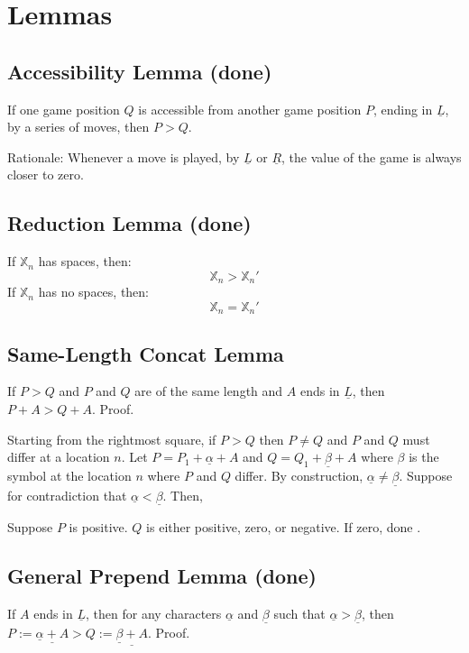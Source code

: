 \documentclass[11pt]{article}
\begin{document}
\section*{Lemmas}
\label{sec:orgdcb17ac}
\subsection*{Accessibility Lemma (done)}
\label{sec:orgc8d915b}
If one game position \(Q\) is accessible from another game position \(P\), ending in \(\underline{L}\), by a series of moves, then \(P > Q\).

Rationale:
Whenever a move is played, by \(\underline{L}\) or \(\underline{R}\), the value of the game is always closer to zero.

\subsection*{Reduction Lemma (done)}
\label{sec:org4b27bec}
If \(\mathbb{X}_{n}\) has spaces, then:
$$\mathbb{X}_{n} > \mathbb{X}_{n}'$$
If \(\mathbb{X}_{n}\) has no spaces, then:
$$\mathbb{X}_{n} = \mathbb{X}_{n}'$$

\subsection*{Same-Length Concat Lemma}
\label{sec:orge7f4bc8}
If \(P > Q\) and \(P\) and \(Q\) are of the same length and \(A\) ends in \(\underline{L}\), then \(P + A > Q + A\).
Proof.

\bigskip
Starting from the rightmost square, if \(P > Q\) then \(P \not= Q\) and \(P\) and \(Q\) must differ at a location \(n\).
Let \(P = P_{1} + \underline{\alpha} + A\) and \(Q = Q_{1} + \underline{\beta} + A\) where \(\beta\) is the symbol at the location \(n\) where \(P\) and \(Q\) differ.
By construction, \(\underline{\alpha} \not= \underline{\beta}\).
Suppose for contradiction that \(\underline{\alpha} < \underline{\beta}\).
Then,

Suppose \(P\) is positive.
\(Q\) is either positive, zero, or negative.
If zero, done .

\subsection*{General Prepend Lemma (done)}
\label{sec:org76d1c95}
If \(A\) ends in \(\underline{L}\), then for any characters \(\underline{\alpha}\) and \(\underline{\beta}\) such that \(\underline{\alpha} > \underline{\beta}\), then \(P := \underline{\underline{\alpha} + A} > Q := \underline{\underline{\beta} + A}\). Proof.
\end{document}
